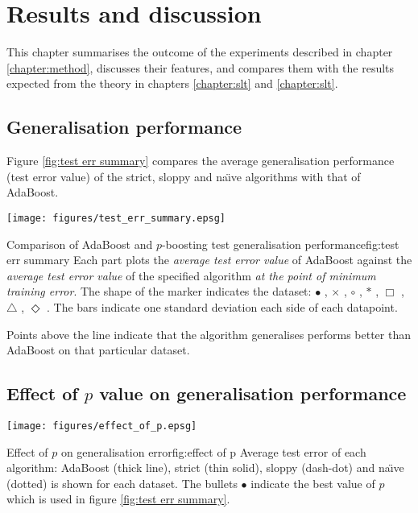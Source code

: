 
\chapter{Results and discussion}
\label{chapter:results}

This chapter summarises the outcome of the experiments described in
chapter \ref{chapter:method}, discusses their features, and compares
them with the results expected from the theory in chapters
\ref{chapter:slt} and \ref{chapter:slt}.

\section{Generalisation performance}

Figure \ref{fig:test err summary} compares the average generalisation
performance (test error value) of the strict, sloppy and na\"{\i}ve
algorithms with that of AdaBoost.




\begin{linefigure}
\begin{center}
\texttt{[image: figures/test\_err\_summary.epsg]}
\end{center}
\begin{capt}{Comparison of AdaBoost and $p$-boosting test
generalisation performance}{fig:test err summary}
Each part plots the \emph{average test error value} of AdaBoost
against the \emph{average test error value} of the specified algorithm
\emph{at the point of minimum training error}.  The shape of the
marker indicates the dataset: $\bullet$ , $\times$
, $\circ$ , $\ast$ , $\Box$
, $\bigtriangleup$ , $\Diamond$ .  The
bars indicate one standard deviation each side of each datapoint.

Points above the line indicate that the algorithm generalises performs
better than AdaBoost on that particular dataset.
\end{capt}
\end{linefigure}


\section{Effect of $p$ value on generalisation performance}

\begin{linefigure}
\begin{center}
\texttt{[image: figures/effect\_of\_p.epsg]}
\end{center}
\begin{capt}{Effect of $p$ on generalisation error}{fig:effect of p}
Average test error of each algorithm: AdaBoost (thick line), strict
(thin solid), sloppy (dash-dot) and na\"{\i}ve (dotted) is shown for
each dataset.  The bullets $\bullet$ indicate the best value of $p$
which is used in figure \ref{fig:test err summary}.
\end{capt}
\end{linefigure}


